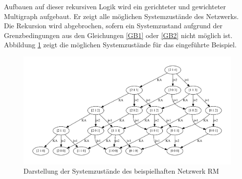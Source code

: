 Aufbauen auf dieser rekursiven Logik wird ein gerichteter und gewichteter Multigraph aufgebaut. Er zeigt alle möglichen Systemzustände des Netzwerks. Die Rekursion wird abgebrochen, sofern ein Systemzustand aufgrund der Grenzbedingungen aus den Gleichungen \eqref{GB1} oder \eqref{GB2} nicht möglich ist. Abbildung \ref{B1} zeigt die möglichen Systemzustände für das eingeführte Beispiel.\\[.5cm]
\begin{figure}[h!]
  \begin{center}
    \includegraphics[width=150mm]{Bilder/Beispiel1.pdf}
    \caption{Darstellung der Systemzustände des beispielhaften Netzwerk RM}  \label{B1}
  \end{center}
\end{figure}

